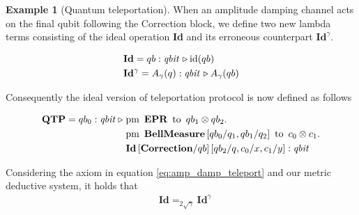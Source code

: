 \documentclass[10pt,a4paper]{amsart}
\theoremstyle{definition}
\theoremstyle{definition}
\newtheorem{example}[definition]{Example}
\theoremstyle{definition}
\theoremstyle{definition}
\theoremstyle{definition}
\theoremstyle{definition}
\begin{document}
\begin{example}[Quantum teleportation]
When an amplitude damping channel acts on the final qubit following the Correction block, we define two new lambda terms consisting of the ideal operation \textbf{Id} and its erroneous counterpart  $\textbf{Id}^{\gamma}$.

\begin{align}\label{eq:id_error_teleport}
  &\textbf{Id} = qb:\textit{qbit} \, \triangleright \mathrm{id} (qb) \\
  & \textbf{Id}^{\gamma} = A_{\gamma} (q):\textit{qbit} \, \triangleright  A_{\gamma} (qb)
\end{align}


Consequently the ideal version of teleportation protocol is now defined as follows

\begin{align*} 
  \textbf{QTP} = qb_{0}: \textit{qbit}\hspace{3 pt} \triangleright \hspace{3 pt} & \text{pm} \hspace{5pt} \textbf{EPR} \hspace{5pt} \text{to} \hspace{5pt}  qb_{1} \otimes qb_{2}.  \notag \\
     & \text{pm}\hspace{5pt} \textbf{BellMeasure}\, [qb_0/q_1,qb_{1}/q_2] \hspace{5pt}  \text{to} \hspace{5pt} c_{0}\otimes c_{1} . \notag \\
     & \textbf{Id} \, [ \textbf{Correction}/qb] \, [qb_{2}/q,c_{0}/x, c_{1}/y] 
     : \emph{qbit}  
 \end{align*}

 Considering the axiom in equation \eqref{eq:amp_damp_teleport} and our metric deductive system, it holds that 
\begin{align*}
  &\textbf{Id}=_{2 \sqrt{\gamma}} \textbf{Id}^{\gamma}
\end{align*}


\end{example}
\end{document}

